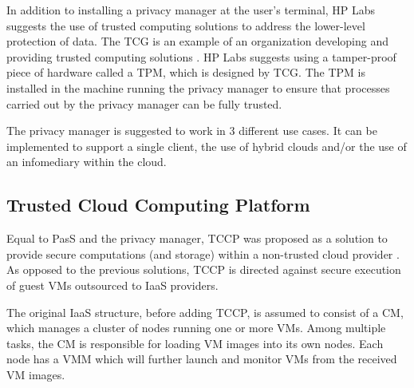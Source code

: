 \documentclass[pdftex,english,10pt,b5paper,twoside]{book}
\begin{document}
In addition to installing a privacy manager at the user's terminal, HP Labs suggests
the use of trusted computing solutions to address the lower-level protection of
data. The \ac{TCG} is an example of an organization
developing and providing trusted computing solutions \cite{tcg}. HP Labs
suggests using a tamper-proof piece of hardware called a \ac{TPM}, which is
designed by TCG. The TPM is installed in the machine running the
privacy manager to ensure that processes carried out by the privacy manager can be
fully trusted.

The privacy manager is suggested to work in 3 different use cases. It can be
implemented to support a single client, the use of hybrid clouds and/or the use of an
infomediary within the cloud.


\subsection{Trusted Cloud Computing Platform}
Equal to PasS and the privacy manager, \ac{TCCP} was proposed as a solution to
provide secure computations (and storage) within a non-trusted cloud provider
\cite{tccp}. As opposed to the previous solutions, TCCP is directed against secure
execution of guest VMs outsourced to IaaS providers. 

The original IaaS structure, before adding TCCP, is assumed to consist of a
\ac{CM}, which manages a cluster of nodes running one or more VMs. Among
multiple tasks, the CM is responsible for loading VM images into its own nodes.
Each node has a \ac{VMM} which will further launch and monitor VMs from the
received VM images.
\end{document}
